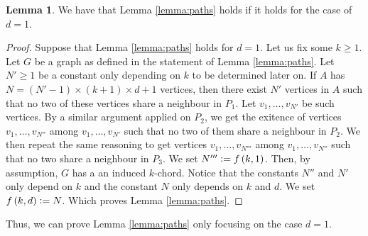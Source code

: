 \documentclass[12pt]{article}
\theoremstyle{definition}
\newtheorem{lemma}[thm]{Lemma}
\newcommand{\defeq}{\vcentcolon=}
\begin{document}
    \begin{lemma} \label{lemma:done}
        We have that Lemma \ref{lemma:paths}
        holds if it holds for the case of $d = 1$.
    \end{lemma}
    \begin{proof}
        Suppose that Lemma \ref{lemma:paths}
        holds for $d = 1$.
        Let us fix some $k \geq 1$.
        Let $G$ be a graph as
        defined in the statement
        of Lemma \ref{lemma:paths}.
        Let $N' \geq 1$ be a constant
        only depending on $k$
        to be determined later on.
        If $A$ has $N = \left(N'-1\right)
        \times \left(k+1\right) \times 
        d + 1$ vertices, then there
        exist $N'$ vertices in $A$ 
        such that no two of these
        vertices share a neighbour
        in $P_1$. 
        Let $v_1, \ldots, v_{N'}$ 
        be such vertices.
        By a similar argument
        applied on $P_2$, we get
        the exitence of vertices
        $v_1, \ldots, v_{N''}$ 
        among $v_1, \ldots, v_{N'}$
        such that no two of them
        share a neighbour in $P_2$.
        We then repeat the same reasoning
        to get vertices
        $v_1, \ldots, v_{N'''}$ 
        among $v_1, \ldots, v_{N''}$
        such that no two share a
        neighbour in $P_3$.
        We set $N''' \defeq f\left(k, 1\right)$.
        Then, by assumption, $G$ has a
        an induced $k$-chord.
        Notice that the constants
        $N''$ and $N'$ only depend
        on $k$ and the constant
        $N$ only depends on $k$ and $d$.
        We set $f\left(k, d\right) \defeq N$.
        Which proves Lemma \ref{lemma:paths}.
    \end{proof}

    Thus, we can prove Lemma \ref{lemma:paths}
    only focusing on the case $d = 1$.
\end{document}
